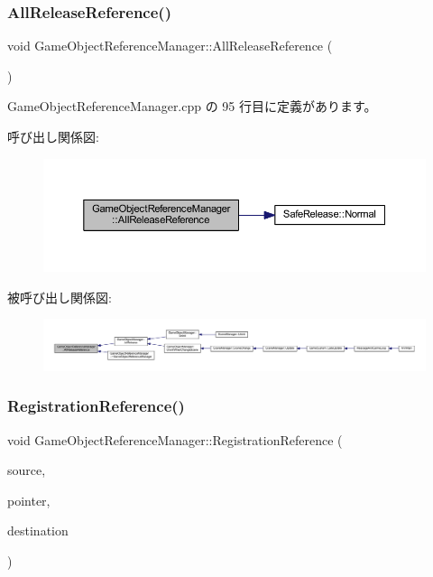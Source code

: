 \subsubsection{\texorpdfstring{All\+Release\+Reference()}{AllReleaseReference()}}
{\footnotesize\ttfamily void Game\+Object\+Reference\+Manager\+::\+All\+Release\+Reference (\begin{DoxyParamCaption}{ }\end{DoxyParamCaption})}



 Game\+Object\+Reference\+Manager.\+cpp の 95 行目に定義があります。

呼び出し関係図\+:\nopagebreak
\begin{figure}[H]
\begin{center}
\leavevmode
\includegraphics[width=350pt]{class_game_object_reference_manager_ac4852ddd6d8bd5e1f13284ba6204e221_cgraph}
\end{center}
\end{figure}
被呼び出し関係図\+:
\nopagebreak
\begin{figure}[H]
\begin{center}
\leavevmode
\includegraphics[width=350pt]{class_game_object_reference_manager_ac4852ddd6d8bd5e1f13284ba6204e221_icgraph}
\end{center}
\end{figure}
\mbox{\label{class_game_object_reference_manager_a4195eafdda534044454b6d48efc7d03d}} 
\subsubsection{\texorpdfstring{Registration\+Reference()}{RegistrationReference()}}
{\footnotesize\ttfamily void Game\+Object\+Reference\+Manager\+::\+Registration\+Reference (\begin{DoxyParamCaption}\item[{\mbox{\hyperlink{class_game_object_base}{Game\+Object\+Base}} $\ast$}]{source,  }\item[{void $\ast$}]{pointer,  }\item[{\mbox{\hyperlink{class_game_object_base}{Game\+Object\+Base}} $\ast$}]{destination }\end{DoxyParamCaption})}



